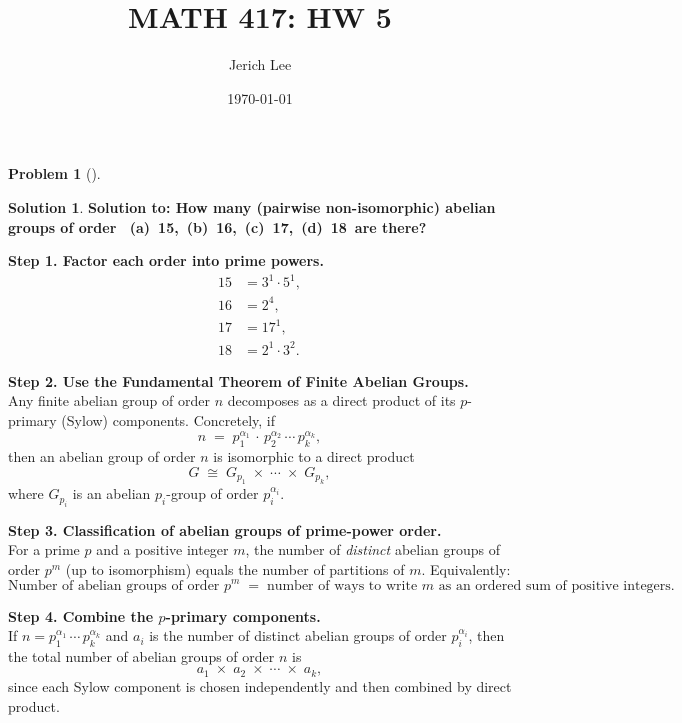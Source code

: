 \documentclass[12pt]{article}
\title{MATH 417: HW 5}
\author{Jerich Lee}
\date{\today}
\theoremstyle{definition} %
\newtheorem{solution}{Solution}
\newtheorem{problem}{Problem}
\theoremstyle{plain} %
\begin{document}
\maketitle
\begin{problem}[]
    
\end{problem}
\begin{solution}
 \textbf{Solution to: How many (pairwise non-isomorphic) abelian groups of order 
\ (a)\ 15,\ (b)\ 16,\ (c)\ 17,\ (d)\ 18\ are there?}

\bigskip

\noindent
\textbf{Step 1. Factor each order into prime powers.}
\[
\begin{aligned}
15 &= 3^1 \cdot 5^1, \\
16 &= 2^4, \\
17 &= 17^1, \\
18 &= 2^1 \cdot 3^2.
\end{aligned}
\]

\noindent
\textbf{Step 2. Use the Fundamental Theorem of Finite Abelian Groups.}\\
Any finite abelian group of order $n$ decomposes as a direct product of its $p$-primary (Sylow) components.  Concretely, if
\[
n \;=\; p_1^{\alpha_1}\,\cdot\,p_2^{\alpha_2}\,\cdots\,p_k^{\alpha_k},
\]
then an abelian group of order $n$ is isomorphic to a direct product
\[
G \;\cong\; G_{p_1}\;\times\;\cdots\;\times\;G_{p_k},
\]
where $G_{p_i}$ is an abelian $p_i$-group of order $p_i^{\alpha_i}$.

\bigskip

\noindent
\textbf{Step 3. Classification of abelian groups of prime-power order.}\\
For a prime $p$ and a positive integer $m$, the number of \emph{distinct} abelian groups of order $p^m$ (up to isomorphism) equals the number of partitions of $m$.  Equivalently:
\[
\text{Number of abelian groups of order }p^m \;=\; \text{number of ways to write }m \text{ as an ordered sum of positive integers.}
\]

\bigskip

\noindent
\textbf{Step 4. Combine the $p$-primary components.}\\
If $n = p_1^{\alpha_1}\,\cdots\,p_k^{\alpha_k}$ and $a_i$ is the number of distinct abelian groups of order $p_i^{\alpha_i}$, then the total number of abelian groups of order $n$ is
\[
a_1 \;\times\; a_2 \;\times\;\cdots\;\times\; a_k,
\]
since each Sylow component is chosen independently and then combined by direct product.


\end{solution}
\end{document}
